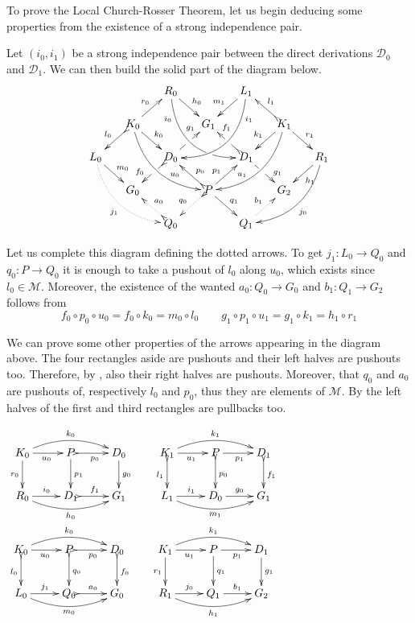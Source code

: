 \documentclass[a4paper,UKenglish,cleveref,pdftex,thm-restate,numberwithinsect,anonymous]{lipics}
\newcommand{\dder}[1]{\mathscr{#1}}
\begin{document}
To prove the Local Church-Rosser Theorem, let us begin deducing some properties from the existence of a strong independence pair. 

\begin{remark}\label{rem:deco} 
	Let $(i_0, i_1)$ be a strong
	independence pair between the direct derivations $\dder{D}_0$ and
	$\dder{D}_1$. We can then build the solid part of the diagram
	below.
	\[\xymatrix@C=15pt@R=15pt{&&R_0 \ar@/_.8cm/[ddrr]_(.2){i_0}|(.7)\hole
		\ar[dr]^{h_0}&& L_1\ar@/^.8cm/[ddll]^(.2){i_1}
		\ar[dl]_{m_1}\\&K_0\ar[dr]^{k_0}\ar@{>->}[dl]_{l_0}
		\ar@/_.6cm/[ddrr]^(.65){u_0}\ar[ur]^{r_0}&& G_1 && K_1
		\ar@/^.6cm/[ddll]_(.65){u_1}\ar[dl]_{k_1}\ar@{>->}[lu]_{l_1}
		\ar[dr]^{r_1}\\L_0 \ar[dr]^{m_0}
		\ar@{.>}@/_.6cm/[ddrr]_{j_1}&& D_0
		\ar@{>->}[dl]|(.42)\hole_(.64){f_0}\ar[ur]|(.48)\hole^(.7){g_1}&&D_1
		\ar[dr]|(.42)\hole^(.65){g_1}
		\ar@{>->}[ul]|(.48)\hole_(.7){f_1}&&R_1\ar@/^.6cm/[ddll]^{j_0}\ar[dl]^{h_1}\\&G_0
		&&P\ar[dr]^{q_1}
		\ar@{>.>}[dl]_{q_0}\ar[ur]^(.4){p_1}\ar@{>->}[ul]_(.4){p_0}&&G_2\\&&Q_0
		\ar@{>->}@{>.>}[ul]_{a_0} &&Q_1\ar@{.>}[ur]^{b_1}}
	\]
	
	Let us complete this diagram defining the dotted arrows. To get
	$j_1\colon L_0\to Q_0$ and $q_0\colon P\to Q_0$ it is enough to
	take a pushout of $l_0$ along $u_0$, which exists since
	$l_0\in \mathcal{M}$. Moreover, the existence of the wanted
	$a_0\colon Q_0\to G_0$ and $b_1\colon Q_1\to G_2$ follows from
	\[
	f_0\circ p_0 \circ u_0 = f_0\circ k_0 = m_0\circ l_0 \qquad
	g_1\circ p_1\circ u_1 = g_1\circ k_1=h_1\circ r_1
	\]
	
	\noindent
	\parbox{5.5cm}{\hspace{15pt}We can prove some other properties of
		the arrows appearing in the diagram above. The four rectangles
		aside are pushouts and their left halves are pushouts
		too. Therefore, by , also their right halves are
		pushouts.  Moreover, that $q_0$ and $a_0$ are pushouts of,
		respectively $l_0$ and $p_0$, thus they are elements of
		$\mathcal{M}$. By  the left halves of the
		first and third rectangles are pullbacks too.}  \parbox{3.5cm}{
		$\xymatrix{K_0 \ar@/^.4cm/[rr]^{k_0}\ar[d]_{r_0}\ar[r]_{u_0}
			&P\ar[d]^{p_1} \ar@{>->}[r]_{p_0} & D_0 \ar[d]^{g_0}&K_1
			\ar@/^.4cm/[rr]^{k_1}\ar@{>->}[d]_{l_1}\ar[r]_{u_1}
			&P\ar@{>->}[d]^{p_0} \ar[r]_{p_1} & D_1 \ar@{>->}[d]^{f_1}\\
			R_0 \ar@/_.4cm/[rr]_{h_0} \ar[r]^{i_0}&D_1 \ar@{>->}[r]^{f_1}
			& G_1&L_1 \ar@/_.4cm/[rr]_{m_1} \ar[r]^{i_1}&D_0\ar[r]^{g_0} &
			G_1}$
		$\xymatrix{K_0
			\ar@/^.4cm/[rr]^{k_0}\ar@{>->}[d]_{l_0}\ar[r]_{u_0}
			&P\ar@{>->}[d]^{q_0} \ar@{>->}[r]_{p_0} & D_0
			\ar@{>->}[d]^{f_0}&K_1
			\ar@/^.4cm/[rr]^{k_1}\ar[d]_{r_1}\ar[r]_{u_1}
			&P\ar[d]^{q_1} \ar[r]_{p_1} & D_1 \ar[d]^{g_1}\\
			L_0 \ar@/_.4cm/[rr]_{m_0} \ar[r]^{j_1}&Q_0 \ar@{>->}[r]^{a_0}
			& G_0&R_1 \ar@/_.4cm/[rr]_{h_1} \ar[r]^{j_0}&Q_1 \ar[r]^{b_1}
			& G_2}$}
\end{remark}
\end{document}
